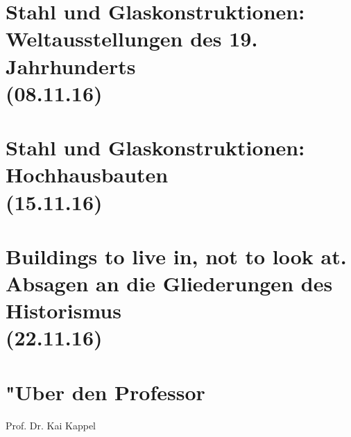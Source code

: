 \documentclass[]{scrartcl}
\begin{document}


\section{Stahl und Glaskonstruktionen: Weltausstellungen des 19. Jahrhunderts\\(08.11.16)}

\section{Stahl und Glaskonstruktionen: Hochhausbauten\\(15.11.16)}

\section{Buildings to live in, not to look at. Absagen an die Gliederungen des Historismus\\(22.11.16)}




\newpage
\section{"Uber den Professor}
Prof. Dr. Kai Kappel
\end{document}
